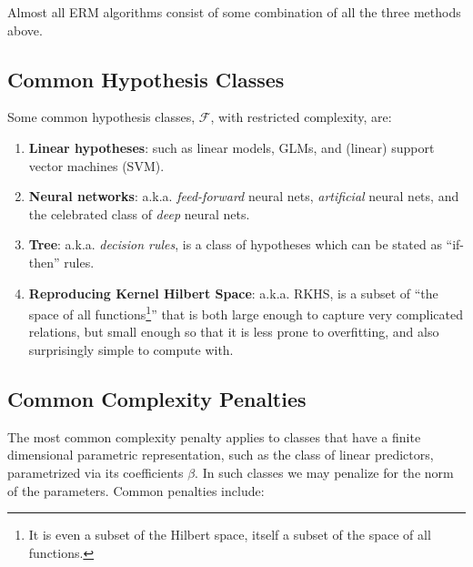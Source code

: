 \documentclass[]{book}
\theoremstyle{definition}
\theoremstyle{definition}
\theoremstyle{definition}
\theoremstyle{remark}
\begin{document}
Almost all ERM algorithms consist of some combination of all the three
methods above.

\subsection{Common Hypothesis Classes}\label{common-hypothesis-classes}

Some common hypothesis classes, \(\mathcal{F}\), with restricted
complexity, are:

\begin{enumerate}
\def\labelenumi{\arabic{enumi}.}
\item
  \textbf{Linear hypotheses}: such as linear models, GLMs, and (linear)
  support vector machines (SVM).
\item
  \textbf{Neural networks}: a.k.a. \emph{feed-forward} neural nets,
  \emph{artificial} neural nets, and the celebrated class of \emph{deep}
  neural nets.
\item
  \textbf{Tree}: a.k.a. \emph{decision rules}, is a class of hypotheses
  which can be stated as ``if-then'' rules.
\item
  \textbf{Reproducing Kernel Hilbert Space}: a.k.a. RKHS, is a subset of
  ``the space of all functions\footnote{It is even a subset of the
    Hilbert space, itself a subset of the space of all functions.}''
  that is both large enough to capture very complicated relations, but
  small enough so that it is less prone to overfitting, and also
  surprisingly simple to compute with.
\end{enumerate}

\subsection{Common Complexity
Penalties}\label{common-complexity-penalties}

The most common complexity penalty applies to classes that have a finite
dimensional parametric representation, such as the class of linear
predictors, parametrized via its coefficients \(\beta\). In such classes
we may penalize for the norm of the parameters. Common penalties
include:
\end{document}
